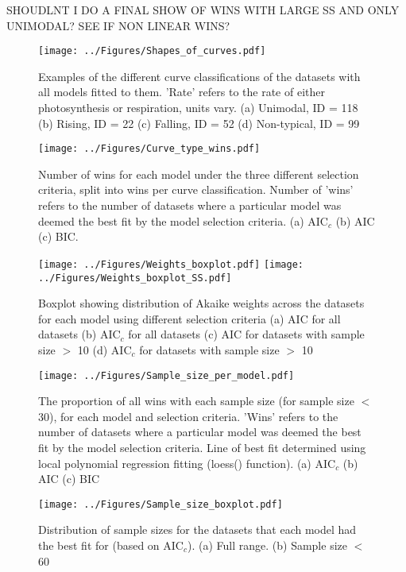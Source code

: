 \documentclass[11pt, a4paper]{article}
\begin{document}
SHOUDLNT I DO A FINAL SHOW OF WINS WITH LARGE SS AND ONLY UNIMODAL? SEE IF NON LINEAR WINS?


\begin{figure} [H]
	\texttt{[image: ../Figures/Shapes\_of\_curves.pdf]}
	\caption{\label{fig:curves} Examples of the different curve classifications of the datasets with all models fitted to them. 'Rate' refers to the rate of either photosynthesis or respiration, units vary. (a) Unimodal, ID = 118 (b) Rising, ID = 22 (c) Falling, ID = 52 (d) Non-typical, ID = 99}
\end{figure}

\begin{figure} [H]
	\centering
	\texttt{[image: ../Figures/Curve\_type\_wins.pdf]}
	\caption{\label{fig:wins_plot} Number of wins for each model under the three different selection criteria, split into wins per curve classification. Number of 'wins' refers to the number of datasets where a particular model was deemed the best fit by the model selection criteria. (a) AIC$_c$ (b) AIC (c) BIC.}	
\end{figure}

\begin{figure} [H]
	\texttt{[image: ../Figures/Weights\_boxplot.pdf]}
	\texttt{[image: ../Figures/Weights\_boxplot\_SS.pdf]}
	\caption{\label{fig:weights} Boxplot showing distribution of Akaike weights across the datasets for each model using different selection criteria (a) AIC for all datasets (b) AIC$_c$ for all datasets (c) AIC for datasets with sample size $>$ 10 (d) AIC$_c$ for datasets with sample size $>$ 10}
\end{figure}


\begin{figure} [H]
	\texttt{[image: ../Figures/Sample\_size\_per\_model.pdf]}
	\caption{\label{fig:sample_size_line} The proportion of all wins with each sample size (for sample size $<$ 30), for each model and selection criteria. 'Wins' refers to the number of datasets where a particular model was deemed the best fit by the model selection criteria. Line of best fit determined using local polynomial regression fitting (loess() function). (a) AIC$_c$ (b) AIC (c) BIC}
\end{figure}

\begin{figure} [H]
	\texttt{[image: ../Figures/Sample\_size\_boxplot.pdf]}
	\caption{\label{fig:sample_size_box} Distribution of sample sizes for the datasets that each model had the best fit for (based on AIC$_c$). (a) Full range. (b) Sample size $<$ 60 }
\end{figure}
\end{document}
